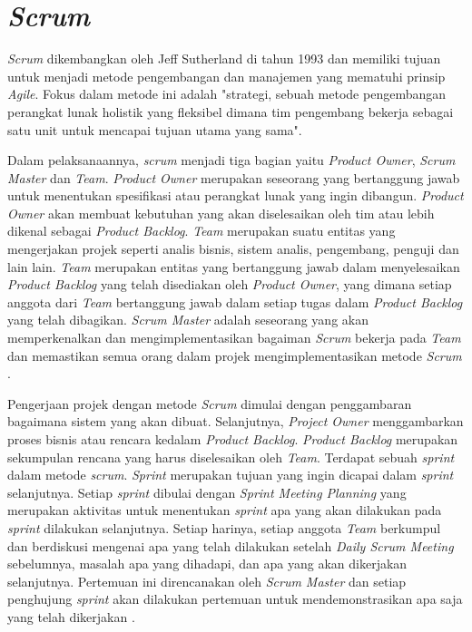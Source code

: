 \section{\textit{Scrum}}
\textit{Scrum} dikembangkan oleh Jeff Sutherland di tahun 1993 dan memiliki tujuan untuk menjadi metode pengembangan dan manajemen yang mematuhi prinsip \textit{Agile}. Fokus dalam metode ini adalah "strategi, sebuah metode pengembangan perangkat lunak holistik yang fleksibel dimana tim pengembang bekerja sebagai satu unit untuk mencapai tujuan utama yang sama". 

Dalam pelaksanaannya, \textit{scrum} menjadi tiga bagian yaitu \textit{Product Owner}, \textit{Scrum Master} dan \textit{Team}. \textit{Product Owner} merupakan seseorang yang bertanggung jawab untuk menentukan spesifikasi atau perangkat lunak yang ingin dibangun. \textit{Product Owner} akan membuat kebutuhan yang akan diselesaikan oleh tim atau lebih dikenal sebagai \textit{Product Backlog}. \textit{Team} merupakan suatu entitas yang mengerjakan projek seperti analis bisnis, sistem analis, pengembang, penguji dan lain lain. \textit{Team} merupakan entitas yang bertanggung jawab dalam menyelesaikan \textit{Product Backlog} yang telah disediakan oleh \textit{Product Owner}, yang dimana setiap anggota dari \textit{Team} bertanggung jawab dalam setiap tugas dalam \textit{Product Backlog} yang telah dibagikan. \textit{Scrum Master} adalah seseorang yang akan memperkenalkan dan mengimplementasikan bagaiman \textit{Scrum} bekerja pada \textit{Team} dan memastikan semua orang dalam projek mengimplementasikan metode \textit{Scrum} \citep{scrum}.

Pengerjaan projek dengan metode \textit{Scrum} dimulai dengan penggambaran bagaimana sistem yang akan dibuat. Selanjutnya, \textit{Project Owner} menggambarkan proses bisnis atau rencara kedalam \textit{Product Backlog}. \textit{Product Backlog} merupakan sekumpulan rencana yang harus diselesaikan oleh \textit{Team}. Terdapat sebuah \textit{sprint} dalam metode \textit{scrum}. \textit{Sprint} merupakan tujuan yang ingin dicapai dalam \textit{sprint} selanjutnya. Setiap \textit{sprint} dibulai dengan \textit{Sprint Meeting Planning} yang merupakan aktivitas untuk menentukan \textit{sprint} apa yang akan dilakukan pada \textit{sprint} dilakukan selanjutnya. Setiap harinya, setiap anggota \textit{Team} berkumpul dan berdiskusi mengenai apa yang telah dilakukan setelah \textit{Daily Scrum Meeting} sebelumnya, masalah apa yang dihadapi, dan apa yang akan dikerjakan selanjutnya. Pertemuan ini direncanakan oleh \textit{Scrum Master} dan setiap penghujung \textit{sprint} akan dilakukan pertemuan untuk mendemonstrasikan apa saja yang telah dikerjakan \citep{scrum}.


